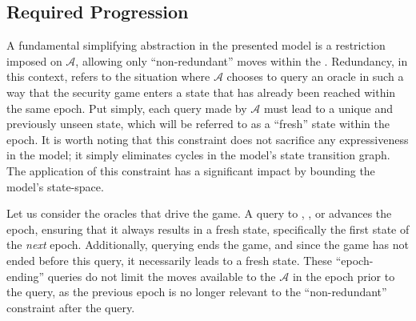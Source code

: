 \documentclass[runningheads]{llncs}
\newcommand{\Adversary}{\ensuremath{\mathcal{A}}\xspace}
\begin{document}

\subsection{Required Progression\label{sec:abstraction-progression}}

A fundamental simplifying abstraction in the presented model is a restriction imposed on \Adversary, allowing only ``non-redundant'' moves within the \CGKAsec.
Redundancy, in this context, refers to the situation where \Adversary chooses to query an oracle in such a way that the security game enters a state that has already been reached within the same epoch.
Put simply, each query made by \Adversary must lead to a unique and previously unseen state, which will be referred to as a ``fresh'' state within the epoch.
It is worth noting that this constraint does not sacrifice any expressiveness in the model; it simply eliminates cycles in the model's state transition graph.
The application of this constraint has a significant impact by bounding the model's state-space.

Let us consider the oracles that drive the game. A query to , , or  advances the epoch, ensuring that it always results in a fresh state, specifically the first state of the \emph{next} epoch.
Additionally, querying  ends the game, and since the game has not ended before this query, it necessarily leads to a fresh state.
These ``epoch-ending'' queries do not limit the moves available to the \Adversary in the epoch prior to the query, as the previous epoch is no longer relevant to the ``non-redundant'' constraint after the query.
\end{document}
